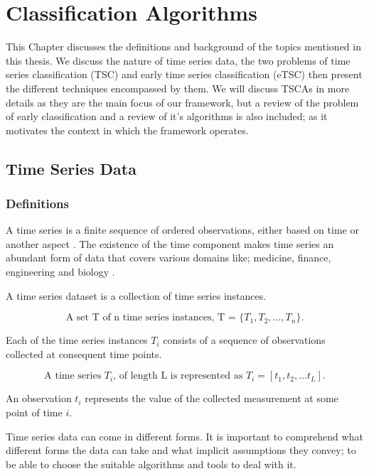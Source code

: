 \chapter{Classification Algorithms}
\label{ChapterClassificationAlgorithms}
This Chapter discusses the definitions and background of the topics mentioned in this thesis.
We discuss the nature of time series data, the two problems of time series classification (TSC) and early time series classification (eTSC) then present the different techniques encompassed by them.
We will discuss TSCAs in more details as they are the main focus of our framework, but a review of the problem of early classification and a review of it's algorithms is also included;
as it motivates the context in which the framework operates.

\section{Time Series Data}
\label{TimeSeriesData}

\subsection{Definitions}
\label{TSDefinitions}
A time series is a finite sequence of ordered observations, either based on time or another aspect \cite{abanda2019review,bagnall2017great}.
The existence of the time component makes time series an abundant form of data that covers various domains like; medicine, finance, engineering and biology \cite{lines2018time}.

A time series dataset is a collection of time series instances.
\begin{definition}
    \[ \textstyle \text{A set T of n time series instances, T = } \{T_{1}, T_{2}, \ldots ,T_{n}\}. \]
\end{definition}
Each of the time series instances $T_{i}$ consists of a sequence of observations collected at consequent time points.
\begin{definition}
    \[ \textstyle \text{A time series } T_{i} \text{, of length L is represented as } T_{i} = [t_{1}, t_{2}, \ldots t_{L}]. \]
\end{definition}
An observation $t_{i}$ represents the value of the collected measurement at some point of time $i$.

Time series data can come in different forms. It is important to comprehend what different forms the data can take and what implicit assumptions they convey; to be able to choose the suitable algorithms and tools to deal with it.

